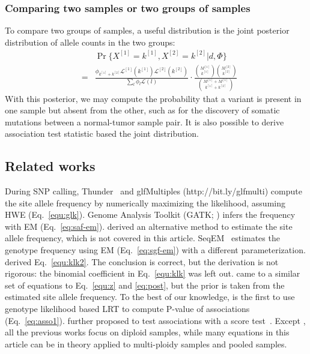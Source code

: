 \documentclass{bioinfo}
\begin{document}
\begin{methods}
\subsubsection{Comparing two samples or two groups of samples}
To compare two groups of samples, a useful distribution is the joint posterior distribution
of allele counts in the two groups:
\begin{eqnarray*}
&&\Pr\{X^{[1]}=k^{[1]},X^{[2]}=k^{[2]}|d,\Phi\}\\
&=&\frac{\phi_{k^{[1]}+k^{[2]}}\mathcal{L}^{[1]}(k^{[1]})\mathcal{L}^{[2]}(k^{[2]})}{\sum_l\phi_l\mathcal{L}(l)}
\cdot\frac{\binom{M^{[1]}}{k^{[1]}}\binom{M^{[2]}}{k^{[2]}}}{\binom{M^{[1]}+M^{[1]}}{k^{[1]}+k^{[2]}}}
\end{eqnarray*}
With this posterior, we may compute the probability that a variant is
present in one sample but absent from the other, such as for the discovery
of somatic mutations between a normal-tumor sample pair. It is also possible to derive association test
statistic based the joint distribution.

\subsection{Related works}
During SNP calling, Thunder~\citep{Li:2011fk} and glfMultiples (http://bit.ly/glfmulti) compute
the site allele frequency by numerically maximizing the likelihood, assuming HWE (Eq.~\eqref{equ:glk}). Genome Analysis Toolkit
(GATK; \citealp{Depristo:2011vn}) infers the frequency with EM (Eq.~\eqref{eq:saf-em}).
\citet{Li:2010ys} derived an alternative method to estimate the site allele frequency, which
is not covered in this article.
SeqEM~\citep{Martin:2010dz}
estimates the genotype frequency using EM (Eq.~\eqref{eq:sgf-em}) with a different parameterization.
\citet{Le:2010uq} derived Eq.~\eqref{equ:klk2}. The conclusion is correct, but the derivation is not
rigorous: the binomial coefficient in Eq.~\eqref{equ:klk} was left out.
\citet{Yi:2010zr} came to a similar set of equations to Eq.~\eqref{equ:z} and \eqref{eq:post}, but
the prior is taken from the estimated site allele frequency.
To the best of our knowledge, \citet{Kim:2010ve} is the first to use genotype likelihood based
LRT to compute P-value of associations (Eq.~\eqref{eq:asso1}). \citet{Nielsen:2011fk}
further proposed to test associations with a score test~\citep{Schaid:2002qf}.
Except \citet{Kim:2010ve}, all the previous works focus on diploid samples, while many equations
in this article can be in theory applied to multi-ploidy samples and pooled samples.

\end{methods}
\end{document}
